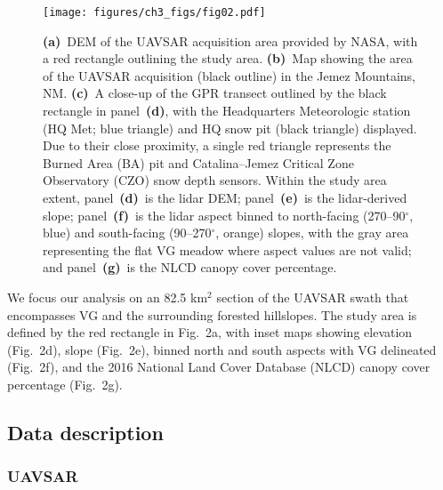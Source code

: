 \begin{figure}[t]
\centering\texttt{[image: figures/ch3\_figs/fig02.pdf]}
\caption{\textbf{(a)}~DEM of the UAVSAR acquisition area provided by NASA, with a red rectangle outlining the study area. \textbf{(b)}~Map showing the area of the UAVSAR acquisition (black outline) in the Jemez Mountains, NM. \textbf{(c)}~A close-up of the GPR transect outlined by the black rectangle in panel~\textbf{(d)}, with the Headquarters Meteorologic station (HQ Met; blue triangle) and HQ snow pit (black triangle) displayed. Due to their close proximity, a single red triangle represents the Burned Area (BA) pit and Catalina--Jemez Critical Zone Observatory (CZO) snow depth sensors. Within the study area extent, panel~\textbf{(d)}~is the lidar DEM; panel~\textbf{(e)}~is the lidar-derived slope; panel~\textbf{(f)}~is the lidar aspect binned to north-facing (270--90$^{\circ}$, blue) and south-facing (90--270$^{\circ}$, orange) slopes, with the gray area representing the flat VG meadow where aspect values are not valid; and panel~\textbf{(g)}~is the NLCD canopy cover percentage.}
\end{figure}
\clearpage

We focus our analysis on an 82.5 km$^{2}$ section of the UAVSAR swath that encompasses VG and the surrounding forested hillslopes. The study area is defined by the red rectangle in Fig.~2a, with inset maps showing elevation (Fig.~2d), slope (Fig.~2e), binned north and south aspects with VG delineated (Fig.~2f), and the 2016 National Land Cover Database (NLCD) canopy cover percentage (Fig.~2g).

\hypertarget{ch3-methods-4}{\subsection{Data description}\label{ch3-methods-4}}
\hypertarget{ch3-methods-5}{\subsubsection{UAVSAR}\label{ch3-methods-5}}


